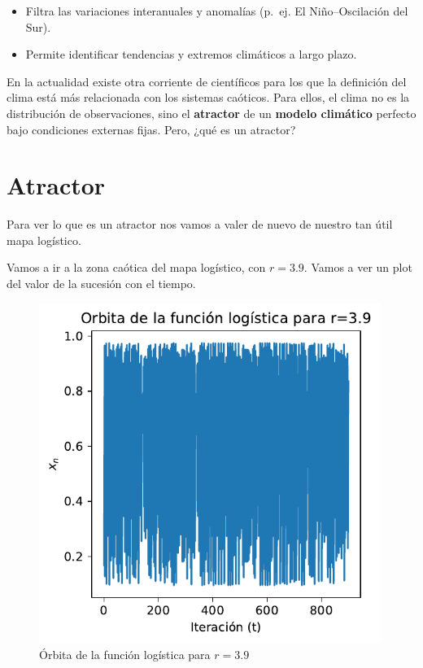 \documentclass[
  10pt,
  a4paper,
  DIV=11,
  numbers=noendperiod,
  open=any]{scrreprt}
\numberwithin{equation}{chapter}
\numberwithin{equation}{section}
\renewcommand{\[}{\begin{equation}}
\renewcommand{\]}{\end{equation}}
\begin{document}
\begin{itemize}
\item
  Filtra las variaciones interanuales y anomalías (p.~ej. El
  Niño--Oscilación del Sur).
\item
  Permite identificar tendencias y extremos climáticos a largo plazo.
\end{itemize}

En la actualidad existe otra corriente de científicos para los que la
definición del clima está más relacionada con los sistemas caóticos.
Para ellos, el clima no es la distribución de observaciones, sino el
\textbf{atractor} de un \textbf{modelo climático} perfecto bajo
condiciones externas fijas. Pero, ¿qué es un atractor?

\section{Atractor}\label{atractor}

Para ver lo que es un atractor nos vamos a valer de nuevo de nuestro tan
útil mapa logístico.

Vamos a ir a la zona caótica del mapa logístico, con \(r=3.9\). Vamos a
ver un plot del valor de la sucesión con el tiempo.

\begin{figure}[h]
  \centering
  \includegraphics[width=0.99\textwidth]{04-clima/atractor_files/figure-pdf/cell-2-output-1.pdf}
  \caption{Órbita de la función logística para $r=3.9$}
\end{figure}
\end{document}

